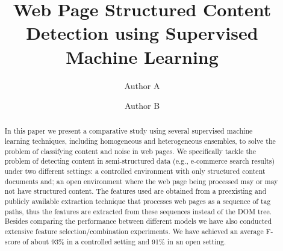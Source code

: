\documentclass[sigconf]{acmart}
\begin{document}



\title{Web Page Structured Content Detection using Supervised Machine Learning}

%

\author{Author A}

\author{Author B}

\begin{abstract}
    In this paper we present a comparative study using several supervised 
    machine learning techniques, including homogeneous and heterogeneous
    ensembles, to solve the problem of classifying content and noise in web
    pages. We specifically tackle the problem of detecting content in 
    semi-structured data (e.g., e-commerce 
    search results) under two different
    settings: a controlled environment with only structured content documents
    and; an open environment where the web page being processed may or may
    not have structured content.
    The features used are obtained from a preexisting and publicly available extraction 
    technique that processes web pages as a sequence of tag paths, thus 
    the features are extracted from these sequences instead of the DOM 
    tree. Besides comparing the performance between different models 
    we have also conducted extensive feature selection/combination 
    experiments. We have achieved an average F-score of about
    93\% in a controlled setting and 91\% in an open setting.
\end{abstract}
\end{document}
